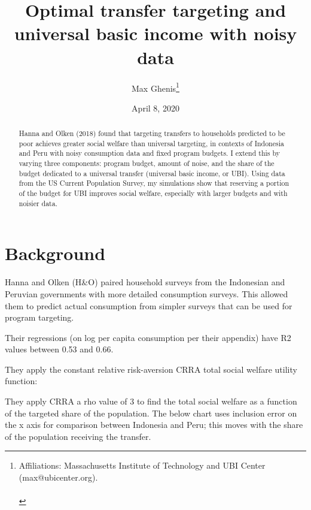 \documentclass[12pt]{article}
\begin{document}
\begin{titlepage}
\title{Optimal transfer targeting and universal basic income with noisy data}
\author{Max Ghenis\thanks{Affiliations: Massachusetts Institute of Technology and UBI Center (max@ubicenter.org).
\protect \\
\protect \\%
}}

\date{April 8, 2020}
\maketitle
\begin{abstract}
\noindent Hanna and Olken (2018) found that targeting transfers to households 
predicted to be poor achieves greater social welfare than universal targeting, 
in contexts of Indonesia and Peru with noisy consumption data and fixed program 
budgets. I extend this by varying three components: program budget, amount of 
noise, and the share of the budget dedicated to a universal transfer (universal 
basic income, or UBI). Using data from the US Current Population Survey, my 
simulations show that reserving a portion of the budget for UBI improves social 
welfare, especially with larger budgets and with noisier data.

\bigskip
\end{abstract}
\setcounter{page}{0}
\thispagestyle{empty}
\end{titlepage}
\pagebreak \newpage




\doublespacing


\section{Background} \label{sec:background}

Hanna and Olken (H\&O) paired household surveys from the Indonesian and 
Peruvian governments with more detailed consumption surveys. This allowed them 
to predict actual consumption from simpler surveys that can be used for program 
targeting.

Their regressions (on log per capita consumption per their appendix) have R2 
values between 0.53 and 0.66.

They apply the constant relative risk-aversion CRRA total social welfare 
utility function:



They apply CRRA a rho value of 3 to find the total social welfare as a function 
of the targeted share of the population. The below chart uses inclusion error 
on the x axis for comparison between Indonesia and Peru; this moves with the 
share of the population receiving the transfer.
\end{document}
